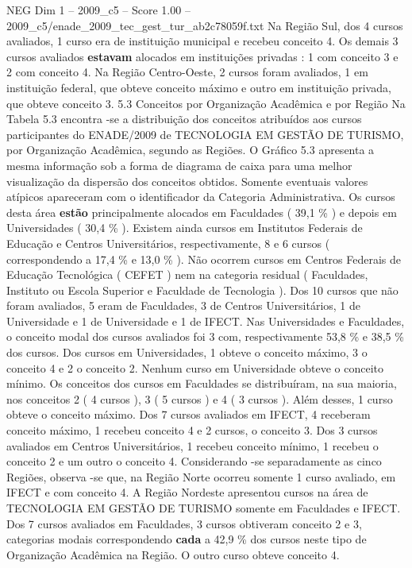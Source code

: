 \begin{textsample}{NEG Dim 1 – 2009\_c5 – Score 1.00 – 2009\_c5/enade\_2009\_tec\_gest\_tur\_ab2c78059f.txt}
Na Região Sul, dos 4 cursos avaliados, 1 curso era de instituição municipal e recebeu conceito 4.
Os demais 3 cursos avaliados \textbf{estavam} alocados em instituições privadas : 1 com conceito 3 e 2 com conceito 4.
Na Região Centro-Oeste, 2 cursos foram avaliados, 1 em instituição federal, que obteve conceito máximo e outro em instituição privada, que obteve conceito 3. 5.3 Conceitos por Organização Acadêmica e por Região Na Tabela 5.3 encontra -se a distribuição dos conceitos atribuídos aos cursos participantes do ENADE/2009 de TECNOLOGIA EM GESTÃO DE TURISMO, por Organização Acadêmica, segundo as Regiões.
O Gráfico 5.3 apresenta a mesma informação sob a forma de diagrama de caixa para uma melhor visualização da dispersão dos conceitos obtidos.
Somente eventuais valores atípicos apareceram com o identificador da Categoria Administrativa.
Os cursos desta área \textbf{estão} principalmente alocados em Faculdades ( 39,1 \% ) e depois em Universidades ( 30,4 \% ).
Existem ainda cursos em Institutos Federais de Educação e Centros Universitários, respectivamente, 8 e 6 cursos ( correspondendo a 17,4 \% e 13,0 \% ).
Não ocorrem cursos em Centros Federais de Educação Tecnológica ( CEFET ) nem na categoria residual ( Faculdades, Instituto ou Escola Superior e Faculdade de Tecnologia ).
Dos 10 cursos que não foram avaliados, 5 eram de Faculdades, 3 de Centros Universitários, 1 de Universidade e 1 de Universidade e 1 de IFECT.
Nas Universidades e Faculdades, o conceito modal dos cursos avaliados foi 3 com, respectivamente 53,8 \% e 38,5 \% dos cursos.
Dos cursos em Universidades, 1 obteve o conceito máximo, 3 o conceito 4 e 2 o conceito 2.
Nenhum curso em Universidade obteve o conceito mínimo.
Os conceitos dos cursos em Faculdades se distribuíram, na sua maioria, nos conceitos 2 ( 4 cursos ), 3 ( 5 cursos ) e 4 ( 3 cursos ).
Além desses, 1 curso obteve o conceito máximo.
Dos 7 cursos avaliados em IFECT, 4 receberam conceito máximo, 1 recebeu conceito 4 e 2 cursos, o conceito 3.
Dos 3 cursos avaliados em Centros Universitários, 1 recebeu conceito mínimo, 1 recebeu o conceito 2 e um outro o conceito 4.
Considerando -se separadamente as cinco Regiões, observa -se que, na Região Norte ocorreu somente 1 curso avaliado, em IFECT e com conceito 4.
A Região Nordeste apresentou cursos na área de TECNOLOGIA EM GESTÃO DE TURISMO somente em Faculdades e IFECT.
Dos 7 cursos avaliados em Faculdades, 3 cursos obtiveram conceito 2 e 3, categorias modais correspondendo \textbf{cada} a 42,9 \% dos cursos neste tipo de Organização Acadêmica na Região.
O outro curso obteve conceito 4.

\end{textsample}
